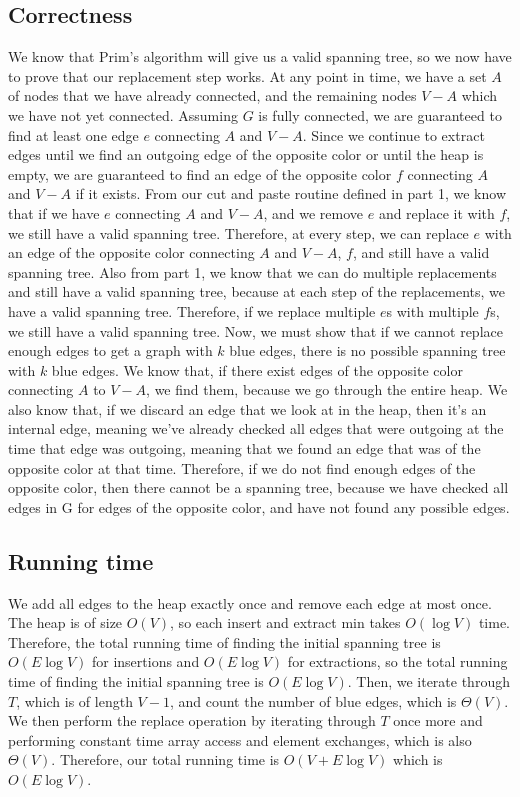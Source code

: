 \documentclass[12pt]{article}
\begin{document}
\subsection*{Correctness}
We know that Prim's algorithm will give us a valid spanning tree, so we now have to prove that our replacement step works. At any point in time, we have a set $A$ of nodes that we have already connected, and the remaining nodes $V-A$ which we have not yet connected. Assuming $G$ is fully connected, we are guaranteed to find at least one edge $e$ connecting $A$ and $V-A$. Since we continue to extract edges until we find an outgoing edge of the opposite color or until the heap is empty, we are guaranteed to find an edge of the opposite color $f$ connecting $A$ and $V-A$ if it exists. From our cut and paste routine defined in part 1, we know that if we have $e$ connecting $A$ and $V-A$, and we remove $e$ and replace it with $f$, we still have a valid spanning tree. Therefore, at every step, we can replace $e$ with an edge of the opposite color connecting $A$ and $V-A$, $f$, and still have a valid spanning tree. Also from part 1, we know that we can do multiple replacements and still have a valid spanning tree, because at each step of the replacements, we have a valid spanning tree. Therefore, if we replace multiple $e$s with multiple $f$s, we still have a valid spanning tree. Now, we must show that if we cannot replace enough edges to get a graph with $k$ blue edges, there is no possible spanning tree with $k$ blue edges. We know that, if there exist edges of the opposite color connecting $A$ to $V-A$, we find them, because we go through the entire heap. We also know that, if we discard an edge that we look at in the heap, then it's an internal edge, meaning we've already checked all edges that were outgoing at the time that edge was outgoing, meaning that we found an edge that was of the opposite color at that time. Therefore, if we do not find enough edges of the opposite color, then there cannot be a spanning tree, because we have checked all edges in G for edges of the opposite color, and have not found any possible edges.

\subsection*{Running time}
We add all edges to the heap exactly once and remove each edge at most once. The heap is of size $O(V)$, so each insert and extract min takes $O(\log V)$ time. Therefore, the total running time of finding the initial spanning tree is $O(E \log V)$ for insertions and $O(E \log V)$ for extractions, so the total running time of finding the initial spanning tree is $O(E \log V)$. Then, we iterate through $T$, which is of length $V-1$, and count the number of blue edges, which is $\Theta(V)$. We then perform the replace operation by iterating through $T$ once more and performing constant time array access and element exchanges, which is also $\Theta(V)$. Therefore, our total running time is $O(V + E \log V)$ which is $O(E \log V)$.
\end{document}
